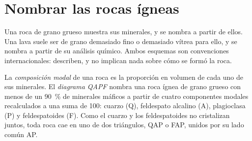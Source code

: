 \section{Nombrar las rocas ígneas}\label{sec:b2:magmatic-series:naming}

Una roca de grano grueso muestra sus minerales, y se nombra a partir de ellos. Una lava suele ser
de grano demasiado fino o demasiado vítrea para ello, y se nombra a partir de su análisis químico. Ambos
esquemas son convenciones internacionales: describen, y no implican nada sobre cómo
se formó la roca.

\begin{definition}\label{def:b2:magmatic-series:qapf}
La \emph{composición modal} de una roca es la proporción en
volumen de cada uno de sus minerales. El \emph{diagrama QAPF} nombra una
roca ígnea de grano grueso con menos de un \qty{90}{\percent} de minerales máficos a partir de
cuatro componentes modales recalculados a una suma de 100: cuarzo (Q), feldespato alcalino
(A), plagioclasa (P) y feldespatoides (F). Como el cuarzo y los feldespatoides no
cristalizan juntos, toda roca cae en uno de dos triángulos, QAP o FAP, unidos
por su lado común AP.
\end{definition}

